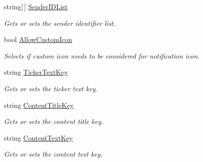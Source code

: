 \begin{DoxyCompactItemize}
\item 
string\mbox{[}$\,$\mbox{]} \hyperlink{class_voxel_busters_1_1_native_plugins_1_1_notification_service_settings_1_1_android_settings_a1f15bc21669f091d1513000272b9c137}{Sender\+I\+D\+List}
\begin{DoxyCompactList}\small\item\em Gets or sets the sender identifier list. \end{DoxyCompactList}\item 
bool \hyperlink{class_voxel_busters_1_1_native_plugins_1_1_notification_service_settings_1_1_android_settings_ac29fd462e0962c7af298777073636fa5}{Allow\+Custom\+Icon}
\begin{DoxyCompactList}\small\item\em Selects if custom icon needs to be considered for notification icon. \end{DoxyCompactList}\item 
string \hyperlink{class_voxel_busters_1_1_native_plugins_1_1_notification_service_settings_1_1_android_settings_a4fa7d8c826b9a9ed9549bf8ef8668e6c}{Ticker\+Text\+Key}
\begin{DoxyCompactList}\small\item\em Gets or sets the ticker text key. \end{DoxyCompactList}\item 
string \hyperlink{class_voxel_busters_1_1_native_plugins_1_1_notification_service_settings_1_1_android_settings_a03807a971a4d892c9d970f09ef67aa69}{Content\+Title\+Key}
\begin{DoxyCompactList}\small\item\em Gets or sets the content title key. \end{DoxyCompactList}\item 
string \hyperlink{class_voxel_busters_1_1_native_plugins_1_1_notification_service_settings_1_1_android_settings_a055563fe8a2b67b2683ca7ae10ae817c}{Content\+Text\+Key}
\begin{DoxyCompactList}\small\item\em Gets or sets the content text key. \end{DoxyCompactList}\item 

\end{DoxyCompactItemize}

